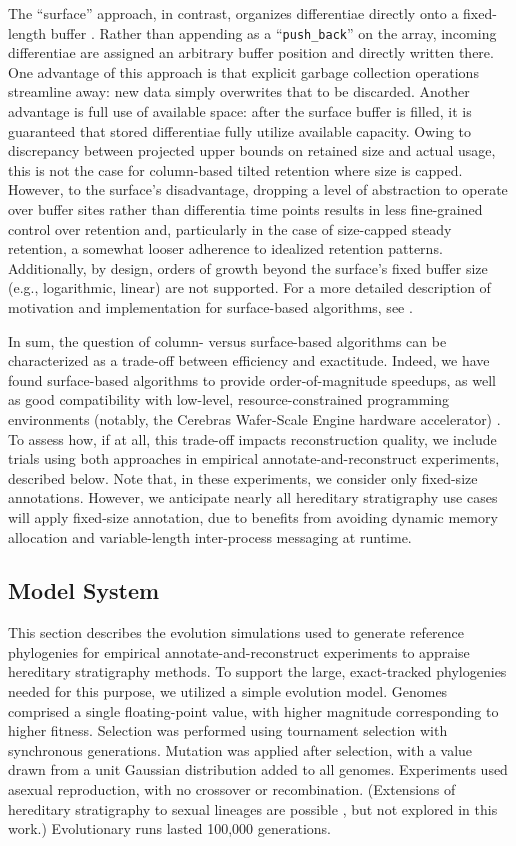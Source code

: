 The ``surface'' approach, in contrast, organizes differentiae directly onto a fixed-length buffer \citep{moreno2024structured}.
Rather than appending as a ``\texttt{push\_back}'' on the array, incoming differentiae are assigned an arbitrary buffer position and directly written there.
One advantage of this approach is that explicit garbage collection operations streamline away: new data simply overwrites that to be discarded.
Another advantage is full use of available space: after the surface buffer is filled, it is guaranteed that stored differentiae fully utilize available capacity.
Owing to discrepancy between projected upper bounds on retained size and actual usage, this is not the case for column-based tilted retention where size is capped.
However, to the surface's disadvantage, dropping a level of abstraction to operate over buffer sites rather than differentia time points results in less fine-grained control over retention and, particularly in the case of size-capped steady retention, a somewhat looser adherence to idealized retention patterns.
Additionally, by design, orders of growth beyond the surface's fixed buffer size (e.g., logarithmic, linear) are not supported.
For a more detailed description of motivation and implementation for surface-based algorithms, see \citep{moreno2024trackable}.

In sum, the question of column- versus surface-based algorithms can be characterized as a trade-off between efficiency and exactitude.
Indeed, we have found surface-based algorithms to provide order-of-magnitude speedups, as well as good compatibility with low-level, resource-constrained programming environments (notably, the Cerebras Wafer-Scale Engine hardware accelerator) \citep{moreno2024trackable}.
To assess how, if at all, this trade-off impacts reconstruction quality, we include trials using both approaches in empirical annotate-and-reconstruct experiments, described below.
Note that, in these experiments, we consider only fixed-size annotations.
However, we anticipate nearly all hereditary stratigraphy use cases will apply fixed-size annotation, due to benefits from avoiding dynamic memory allocation and variable-length inter-process messaging at runtime.

\subsection{Model System}

This section describes the evolution simulations used to generate reference phylogenies for empirical annotate-and-reconstruct experiments to appraise hereditary stratigraphy methods.
To support the large, exact-tracked phylogenies needed for this purpose, we utilized a simple evolution model.
Genomes comprised a single floating-point value, with higher magnitude corresponding to higher fitness.
Selection was performed using tournament selection with synchronous generations.
Mutation was applied after selection, with a value drawn from a unit Gaussian distribution added to all genomes.
Experiments used asexual reproduction, with no crossover or recombination.
(Extensions of hereditary stratigraphy to sexual lineages are possible \citep{moreno2024methods}, but not explored in this work.)
Evolutionary runs lasted 100,000 generations.


